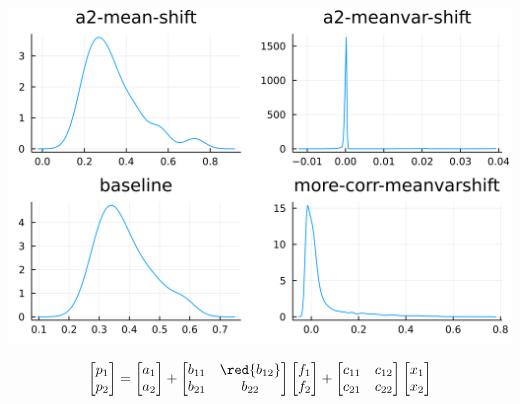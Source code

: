 \documentclass[
  ignorenonframetext,
]{beamer}
\begin{document}
\begin{frame}{}
\protect\hypertarget{section-8}{}
\begin{center}\includegraphics[width=0.95\paperheight]{complexity_files/figure-beamer/unnamed-chunk-30-1} \end{center}

\[
\begin{bmatrix}
 p_1 \\ p_2
\end{bmatrix} =
\begin{bmatrix}
 a_1 \\ {a_2}
\end{bmatrix}
 + 
 \begin{bmatrix}
 {b_{11}} & \red{b_{12}} \\
 {b_{21}} & {b_{22}}
\end{bmatrix}
\begin{bmatrix}
 f_1 \\ f_2
\end{bmatrix}
+
 \begin{bmatrix}
 c_{11} & c_{12} \\
 c_{21} & c_{22}
\end{bmatrix}
\begin{bmatrix}
 x_1 \\ x_2
\end{bmatrix}
\]
\end{frame}
\end{document}
